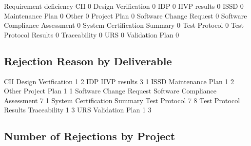 \documentclass{article}
\begin{document}
\begin{Schunk}
\begin{Soutput}
                                 Requirement deficiency
  CII                                                 0
  Design Verification                                 0
  IDP                                                 0
  IIVP results                                        0
  ISSD                                                0
  Maintenance Plan                                    0
  Other                                               0
  Project Plan                                        0
  Software Change Request                             0
  Software Compliance Assessment                      0
  System Certification Summary                        0
  Test Protocol                                       0
  Test Protocol Results                               0
  Traceability                                        0
  URS                                                 0
  Validation Plan                                     0
\end{Soutput}
\end{Schunk}


\subsection{Rejection Reason by Deliverable}

\begin{Schunk}
\begin{Soutput}
                           CII            Design Verification
                             1                              2
                           IDP                   IIVP results
                             3                              1
                          ISSD               Maintenance Plan
                             1                              2
                         Other                   Project Plan
                             1                              1
       Software Change Request Software Compliance Assessment
                             7                              1
  System Certification Summary                  Test Protocol
                             7                              8
         Test Protocol Results                   Traceability
                             1                              3
                           URS                Validation Plan
                             1                              3
\end{Soutput}
\end{Schunk}

\subsection{Number of Rejections by Project}
\end{document}
